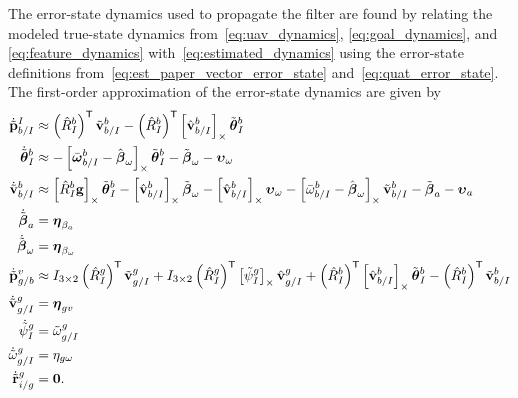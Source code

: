 The error-state dynamics used to propagate the filter are found by relating
the modeled true-state dynamics from~\eqref{eq:uav_dynamics},
\eqref{eq:goal_dynamics}, and \eqref{eq:feature_dynamics}
with~\eqref{eq:estimated_dynamics} using the error-state definitions
from~\eqref{eq:est_paper_vector_error_state} and~\eqref{eq:quat_error_state}. The
first-order approximation of the error-state dynamics are given by 
\begin{align}
  \dot{\tilde{\boldsymbol{\mathrm{p}}}}_{b/I}^I
  &\approx
  \left( \hat{R}_I^b \right)^{\mathsf{T}} \tilde{\boldsymbol{\mathrm{v}}}_{b/I}^b
  - \left( \hat{R}_I^b \right)^{\mathsf{T}} \left[ \hat{\boldsymbol{\mathrm{v}}}_{b/I}^b \right]_{\times}
  \tilde{\boldsymbol{\mathrm{\theta}}}_I^b
  \\
  \dot{\tilde{\boldsymbol{\mathrm{\theta}}}}_{I}^{b} 
  &\approx 	
  -\left[  \bar{\boldsymbol{\mathrm{\omega}}}_{b/I}^b - \hat{\boldsymbol{\mathrm{\beta}}}_\omega \right]_{\times}
    \tilde{\boldsymbol{\mathrm{\theta}}}_I^b
    - \tilde{\boldsymbol{\mathrm{\beta}}}_\omega -
    \boldsymbol{\mathrm{\upsilon}}_\omega
  \nonumber \\
  \dot{\tilde{\boldsymbol{\mathrm{v}}}}_{b/I}^b 
  &\approx
  \left[  \hat{R}_I^b \boldsymbol{\mathrm{g}}  \right]_{\times} \tilde{\boldsymbol{\mathrm{\theta}}}_I^b 
  -
  \left[  \hat{\boldsymbol{\mathrm{v}}}_{b/I}^b  \right]_{\times} \tilde{\boldsymbol{\mathrm{\beta}}}_\omega
  -
  \left[  \hat{\boldsymbol{\mathrm{v}}}_{b/I}^b  \right]_{\times} \boldsymbol{\mathrm{\upsilon}}_\omega
  -
  \left[  \bar{\omega}_{b/I}^b - \hat{\boldsymbol{\mathrm{\beta}}}_\omega  \right]_{\times}
  \tilde{\boldsymbol{\mathrm{v}}}_{b/I}^b
  -
  \tilde{\boldsymbol{\mathrm{\beta}}}_a
  -
  \boldsymbol{\mathrm{\upsilon}}_a \nonumber
  \\
  \dot{\tilde{\boldsymbol{\mathrm{\beta}}}}_a &= \boldsymbol{\mathrm{\eta}}_{\beta_a} \nonumber
  \\
  \dot{\tilde{\boldsymbol{\mathrm{\beta}}}}_\omega &= \boldsymbol{\mathrm{\eta}}_{\beta_\omega} \nonumber
  \\
  \dot{\tilde{\boldsymbol{\mathrm{p}}}}_{g/b}^{v}
                                  &\approx
  I_{3 \times 2} \left( \hat{R}_{I}^{g} \right)^{\mathsf{T}}
  \tilde{\boldsymbol{\mathrm{v}}}_{g/I}^g
  +
  I_{3 \times 2} \left( \hat{R}_{I}^{g} \right)^{\mathsf{T}}
  \left[  \tilde{\psi}_I^g  \right]_{\times} \hat{\boldsymbol{\mathrm{v}}}_{g/I}^g
  +
  \left( \hat{R}_{I}^{b} \right)^{\mathsf{T}} \left[  \hat{\boldsymbol{\mathrm{v}}}_{b/I}^{b}  \right]_{\times} 
  \tilde{\boldsymbol{\mathrm{\theta}}}_I^b
  -
  \left( \hat{R}_{I}^{b} \right)^{\mathsf{T}} \tilde{\boldsymbol{\mathrm{v}}}_{b/I}^{b} \nonumber \\
  \dot{\tilde{\boldsymbol{\mathrm{v}}}}_{g/I}^{g} &= \boldsymbol{\mathrm{\eta}}_{gv} \nonumber \\
  \dot{\tilde{\psi}}_{I}^{g} &= \tilde{\omega}_{g/I}^g \nonumber \\
  \dot{\tilde{\omega}}_{g/I}^{g} &= \eta_{g\omega} \nonumber \\
  \dot{\tilde{\boldsymbol{\mathrm{r}}}}_{i/g}^g &= \boldsymbol{\mathrm{0}}. \nonumber
\end{align}

